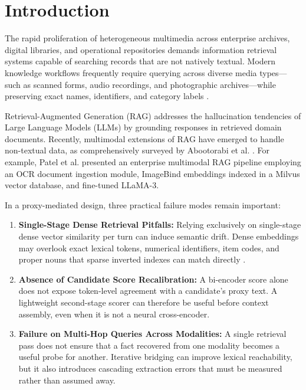 \documentclass[conference]{IEEEtran}
\begin{document}
\section{Introduction}

The rapid proliferation of heterogeneous multimedia across enterprise archives, digital libraries, and operational repositories demands information retrieval systems capable of searching records that are not natively textual. Modern knowledge workflows frequently require querying across diverse media types—such as scanned forms, audio recordings, and photographic archives—while preserving exact names, identifiers, and category labels \cite{jing2024llmvectordb}.

Retrieval-Augmented Generation (RAG) \cite{lewis2020rag} addresses the hallucination tendencies of Large Language Models (LLMs) by grounding responses in retrieved domain documents. Recently, multimodal extensions of RAG have emerged to handle non-textual data, as comprehensively surveyed by Abootorabi et al. \cite{abootorabi2025multimodal}. For example, Patel et al. \cite{patel2025multimodal} presented an enterprise multimodal RAG pipeline employing an OCR document ingestion module, ImageBind embeddings indexed in a Milvus vector database, and fine-tuned LLaMA-3.

In a proxy-mediated design, three practical failure modes remain important:

\begin{enumerate}
    \setlength{\itemsep}{1pt plus 0.5pt}
    \setlength{\parskip}{0pt}
    \item \textbf{Single-Stage Dense Retrieval Pitfalls:} Relying exclusively on single-stage dense vector similarity per turn can induce semantic drift. Dense embeddings may overlook exact lexical tokens, numerical identifiers, item codes, and proper nouns that sparse inverted indexes can match directly \cite{robertson2009bm25}.
    \item \textbf{Absence of Candidate Score Recalibration:} A bi-encoder score alone does not expose token-level agreement with a candidate's proxy text. A lightweight second-stage scorer can therefore be useful before context assembly, even when it is not a neural cross-encoder.
    \item \textbf{Failure on Multi-Hop Queries Across Modalities:} A single retrieval pass does not ensure that a fact recovered from one modality becomes a useful probe for another. Iterative bridging can improve lexical reachability, but it also introduces cascading extraction errors that must be measured rather than assumed away.
\end{enumerate}
\end{document}

